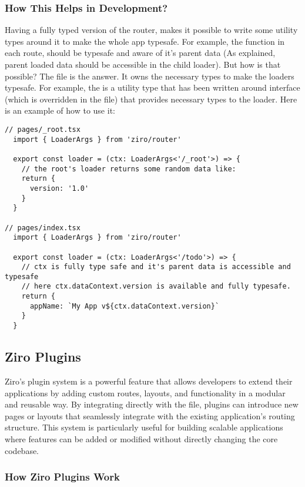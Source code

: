 \subsubsection*{How This Helps in Development?}
Having a fully typed version of the router, makes it possible to write some utility types around it to make the whole app typesafe. For example, the  function in each route, should be typesafe and aware of it's parent data (As explained, parent loaded data should be accessible in the child loader). But how is that possible? The  file is the answer. It owns the necessary types to make the loaders typesafe. For example, the  is a utility type that has been written around  interface (which is overridden in the  file) that provides necessary types to the loader. Here is an example of how to use it:
\begin{verbatim}
// pages/_root.tsx
  import { LoaderArgs } from 'ziro/router'

  export const loader = (ctx: LoaderArgs<'/_root'>) => {
    // the root's loader returns some random data like:
    return {
      version: '1.0'
    }
  }

// pages/index.tsx
  import { LoaderArgs } from 'ziro/router'

  export const loader = (ctx: LoaderArgs<'/todo'>) => {
    // ctx is fully type safe and it's parent data is accessible and typesafe
    // here ctx.dataContext.version is available and fully typesafe.
    return {
      appName: `My App v${ctx.dataContext.version}`
    }
  }
\end{verbatim}
\pagebreak

\subsection{Ziro Plugins}

Ziro’s plugin system is a powerful feature that allows developers to extend their applications by adding custom routes, layouts, and functionality in a modular and reusable way. By integrating directly with the  file, plugins can introduce new pages or layouts that seamlessly integrate with the existing application’s routing structure. This system is particularly useful for building scalable applications where features can be added or modified without directly changing the core codebase.

\subsubsection{How Ziro Plugins Work}

